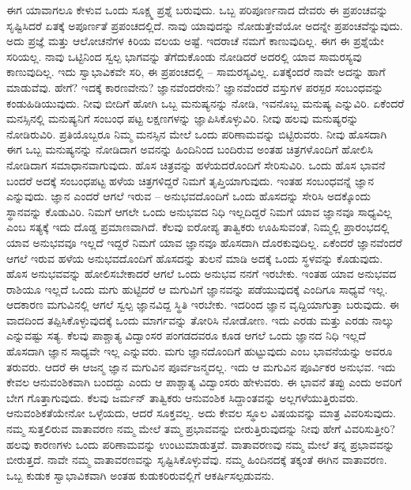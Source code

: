 ಈಗ ಯಾವಾಗಲೂ ಕೇಳುವ ಒಂದು ಸೂಕ್ಷ್ಮ ಪ್ರಶ್ನೆ ಬರುವುದು. ಒಬ್ಬ ಪರಿಪೂರ್ಣನಾದ ದೇವರು ಈ ಪ್ರಪಂಚವನ್ನು ಸೃಷ್ಟಿಸಿದರೆ ಏತಕ್ಕೆ ಅಪೂರ್ಣತೆ ಪ್ರಪಂಚದಲ್ಲಿದೆ. ನಾವು ಯಾವುದನ್ನು ನೋಡುತ್ತೇವೆಯೋ ಅದನ್ನೇ ಪ್ರಪಂಚವೆನ್ನುವುದು. ಅದು ಪ್ರಜ್ಞೆ ಮತ್ತು ಆಲೋಚನೆಗಳ ಕಿರಿಯ ವಲಯ ಅಷ್ಟೆ. ಇದರಾಚೆ ನಮಗೆ ಕಾಣುವುದಿಲ್ಲ. ಈಗ ಈ ಪ್ರಶ್ನೆಯೇ ಸರಿಯಲ್ಲ. ನಾವು ಒಟ್ಟಿನಿಂದ ಸ್ವಲ್ಪ ಭಾಗವನ್ನು ತೆಗೆದುಕೊಂಡು ನೋಡಿದರೆ ಅದರಲ್ಲಿ ಯಾವ ಸಾಮರಸ್ಯವು ಕಾಣುವುದಿಲ್ಲ. ಇದು ಸ್ವಾಭಾವಿಕವೇ ಸರಿ, ಈ ಪ್ರಪಂಚದಲ್ಲಿ – ಸಾಮರಸ್ಯವಿಲ್ಲ. ಏತಕ್ಕೆಂದರೆ ನಾವೇ ಅದನ್ನು ಹಾಗೆ ಮಾಡುವೆವು. ಹೇಗೆ? ಇದಕ್ಕೆ ಕಾರಣವೇನು? ಜ್ಞಾನವೆಂದರೇನು? ಜ್ಞಾನವೆಂದರೆ ವಸ್ತುಗಳ ಪರಸ್ಪರ ಸಂಬಂಧವನ್ನು ಕಂಡುಹಿಡಿಯುವುದು. ನೀವು ಬೀದಿಗೆ ಹೋಗಿ ಒಬ್ಬ ಮನುಷ್ಯನನ್ನು ನೋಡಿ, ಇವನೊಬ್ಬ ಮನುಷ್ಯ ಎನ್ನುವಿರಿ. ಏಕೆಂದರೆ ಮನಸ್ಸಿನಲ್ಲಿ ಮನುಷ್ಯನಿಗೆ ಸಂಬಂಧ ಪಟ್ಟ ಲಕ್ಷಣಗಳನ್ನು ಜ್ಞಾಪಿಸಿಕೊಳ್ಳುವಿರಿ. ನೀವು ಹಲವು ಮನುಷ್ಯರನ್ನು ನೋಡಿರುವಿರಿ. ಪ್ರತಿಯೊಬ್ಬರೂ ನಿಮ್ಮ ಮನಸ್ಸಿನ ಮೇಲೆ ಒಂದು ಪರಿಣಾಮವನ್ನು ಬಿಟ್ಟಿರುವರು. ನೀವು ಹೊಸದಾಗಿ ಈಗ ಒಬ್ಬ ಮನುಷ್ಯನನ್ನು ನೋಡಿದಾಗ ಅವನನ್ನು ಹಿಂದಿನಿಂದ ಬಂದಿರುವ ಅಂತಹ ಚಿತ್ರಗಳೊಂದಿಗೆ ಹೋಲಿಸಿ ನೋಡಿದಾಗ ಸಮಾಧಾನವಾಗುವುದು. ಹೊಸ ಚಿತ್ರವನ್ನು ಹಳೆಯದರೊಂದಿಗೆ ಸೇರಿಸುವಿರಿ. ಒಂದು ಹೊಸ ಭಾವನೆ ಬಂದರೆ ಅದಕ್ಕೆ ಸಂಬಂಧಪಟ್ಟ ಹಳೆಯ ಚಿತ್ರಗಳಿದ್ದರೆ ನಿಮಗೆ ತೃಪ್ತಿಯಾಗುವುದು. ಇಂತಹ ಸಂಬಂಧವನ್ನೆ ಜ್ಞಾನ ಎನ್ನುವುದು. ಜ್ಞಾನ ಎಂದರೆ ಆಗಲೆ ಇರುವ – ಅನುಭವದೊಂದಿಗೆ ಒಂದು ಹೊಸದನ್ನು ಸೇರಿಸಿ ಅದಕ್ಕೊಂದು ಸ್ಥಾನವನ್ನು ಕೊಡುವಿರಿ. ನಿಮಗೆ ಆಗಲೇ ಒಂದು ಅನುಭವದ ನಿಧಿ ಇಲ್ಲದಿದ್ದರೆ ನಿಮಗೆ ಯಾವ ಜ್ಞಾನವೂ ಸಾಧ್ಯವಿಲ್ಲ ಎಂಬ ಸತ್ಯಕ್ಕೆ ಇದು ದೊಡ್ಡ ಪ್ರಮಾಣವಾಗಿದೆ. ಕೆಲವು ಐರೋಪ್ಯ ತಾತ್ವಿಕರು ಊಹಿಸುವಂತೆ, ನಿಮ್ಮಲ್ಲಿ ಪ್ರಾರಂಭದಲ್ಲಿ ಯಾವ ಅನುಭವವೂ ಇಲ್ಲದೆ ಇದ್ದರೆ ನಿಮಗೆ ಯಾವ ಜ್ಞಾನವೂ ಹೊಸದಾಗಿ ದೊರಕುವುದಿಲ್ಲ. ಏಕೆಂದರೆ ಜ್ಞಾನವೆಂದರೆ ಆಗಲೆ ಇರುವ ಹಳೆಯ ಅನುಭವದೊಂದಿಗೆ ಹೊಸದನ್ನು ತುಲನೆ ಮಾಡಿ ಅದಕ್ಕೆ ಒಂದು ಸ್ಥಳವನ್ನು ಕೊಡುವುದು. ಹೊಸ ಅನುಭವವನ್ನು ಹೋಲಿಸಬೇಕಾದರೆ ಆಗಲೆ ಒಂದು ಅನುಭವ ನನಗೆ ಇರಬೇಕು. ಇಂತಹ ಯಾವ ಅನುಭವದ ರಾಶಿಯೂ ಇಲ್ಲದೆ ಒಂದು ಮಗು ಹುಟ್ಟಿದರೆ ಆ ಮಗುವಿಗೆ ಜ್ಞಾನವನ್ನು ಪಡೆಯುವುದಕ್ಕೆ ಎಂದಿಗೂ ಸಾಧ್ಯವೆ ಇಲ್ಲ. ಆದಕಾರಣ ಮಗುವಿನಲ್ಲಿ ಆಗಲೆ ಸ್ವಲ್ಪ ಜ್ಞಾನವಿದ್ದ ಸ್ಥಿತಿ ಇರಬೇಕು. ಇದರಿಂದ ಜ್ಞಾನ ವೃದ್ದಿಯಾಗುತ್ತಾ ಬರುವುದು. ಈ ವಾದದಿಂದ ತಪ್ಪಿಸಿಕೊಳ್ಳುವುದಕ್ಕೆ ಒಂದು ಮಾರ್ಗವನ್ನು ತೋರಿಸಿ ನೋಡೋಣ. ಇದು ಎರಡು ಮತ್ತು ಎರಡು ನಾಲ್ಕು ಎನ್ನುವಷ್ಟು ಸತ್ಯ. ಕೆಲವು ಪಾಶ್ಚಾತ್ಯ ವಿದ್ವಾಂಸರ ಪಂಗಡದವರೂ ಕೂಡ ಆಗಲೆ ಒಂದು ಜ್ಞಾನದ ನಿಧಿ ಇಲ್ಲದೆ ಹೊಸದಾಗಿ ಜ್ಞಾನ ಸಾಧ್ಯವೇ ಇಲ್ಲ ಎನ್ನುವರು. ಮಗು ಜ್ಞಾನದೊಂದಿಗೆ ಹುಟ್ಟುವುದು ಎಂಬ ಭಾವನೆಯನ್ನು ಅವರೂ ತರುವರು. ಆದರೆ ಈ ಆಜನ್ಮ ಜ್ಞಾನ ಮಗುವಿನ ಪೂರ್ವಜನ್ಮದಲ್ಲ. ಇದು ಆ ಮಗುವಿನ ಪೂರ್ವಿಕರ ಅನುಭವ. ಇದು ಕೇವಲ ಆನುವಂಶಿಕವಾಗಿ ಬಂದದ್ದು ಎಂದು ಆ ಪಾಶ್ಚಾತ್ಯ ವಿದ್ವಾಂಸರು ಹೇಳುವರು. ಈ ಭಾವನೆ ತಪ್ಪು ಎಂದು ಅವರಿಗೆ ಬೇಗ ಗೊತ್ತಾಗುವುದು. ಕೆಲವು ಜರ್ಮನ್ ತಾತ್ವಿಕರು ಆನುವಂಶಿಕ ಸಿದ್ದಾಂತವನ್ನು ಅಲ್ಲಗಳೆಯುತ್ತಿರುವರು. ಆನುವಂಶಿಕತೆಯೇನೋ ಒಳ್ಳೆಯದು, ಆದರೆ ಸೂಕ್ತವಲ್ಲ. ಅದು ಕೇವಲ ಸ್ಥೂಲ ವಿಷಯವನ್ನು ಮಾತ್ರ ವಿವರಿಸುವುದು. ನಮ್ಮ ಸುತ್ತಲಿರುವ ವಾತಾವರಣ ನಮ್ಮ ಮೇಲೆ ತಮ್ಮ ಪ್ರಭಾವವನ್ನು ಬೀರುತ್ತಿರುವುದನ್ನು ನೀವು ಹೇಗೆ ವಿವರಿಸುತ್ತೀರಿ? ಹಲವು ಕಾರಣಗಳು ಒಂದು ಪರಿಣಾಮವನ್ನು ಉಂಟುಮಾಡುತ್ತವೆ. ವಾತಾವರಣವು ನಮ್ಮ ಮೇಲೆ ತನ್ನ ಪ್ರಭಾವವನ್ನು ಬೀರುತ್ತದೆ. ನಾವೇ ನಮ್ಮ ವಾತಾವರಣವನ್ನು ಸೃಷ್ಟಿಸಿಕೊಳ್ಳುವೆವು. ನಮ್ಮ ಹಿಂದಿನದಕ್ಕೆ ತಕ್ಕಂತೆ ಈಗಿನ ವಾತಾವರಣ. ಒಬ್ಬ ಕುಡುಕ ಸ್ವಾಭಾವಿಕವಾಗಿ ಅಂತಹ ಕುಡುಕರಿರುವಲ್ಲಿಗೆ ಆಕರ್ಷಿಸಲ್ಪಡುವನು.

